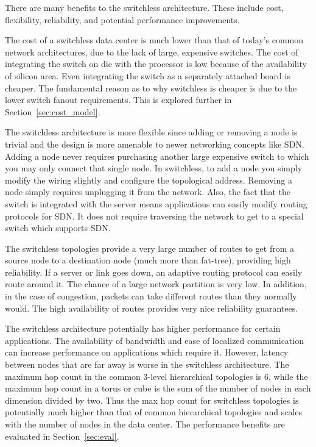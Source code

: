 There are many benefits to the switchless architecture.  These include cost, flexibility, reliability, and potential performance improvements.  

The cost of a switchless data center is much lower than that of today's common network architectures, due to the lack of large, expensive switches.  The cost of integrating the switch on die with the processor is low because of the availability of silicon area.  Even integrating the switch as a separately attached board is cheaper.  The fundamental reason as to why switchless is cheaper is due to the lower switch fanout requirements.  This is explored further in Section~\ref{sec:cost_model}.

The switchless architecture is more flexible since adding or removing a node is trivial and the design is more amenable to newer networking concepts like SDN.  Adding a node never requires purchasing another large expensive switch to which you may only connect that single node.  In switchless, to add a node you simply modify the wiring slightly and configure the topological address.  Removing a node simply requires unplugging it from the network.  Also, the fact that the switch is integrated with the server means applications can easily modify routing protocols for SDN.  It does not require traversing the network to get to a special switch which supports SDN.

The switchless topologies provide a very large number of routes to get from a source node to a destination node (much more than fat-tree), providing high reliability.  If a server or link goes down, an adaptive routing protocol can easily route around it.  The chance of a large network partition is very low.  In addition, in the case of congestion, packets can take different routes than they normally would.  The high availability of routes provides very nice reliability guarantees.

The switchless architecture potentially has higher performance for certain applications.  The availability of bandwidth and ease of localized communication can increase performance on applications which require it.  However, latency between nodes that are far away is worse in the switchless architecture.  The maximum hop count in the common 3-level hierarchical topologies is 6, while the maximum hop count in a torus or cube is the sum of the number of nodes in each dimension divided by two.  Thus the max hop count for switchless topologies is potentially much higher than that of common hierarchical topologies and scales with the number of nodes in the data center.  The performance benefits are evaluated in Section~\ref{sec:eval}.
